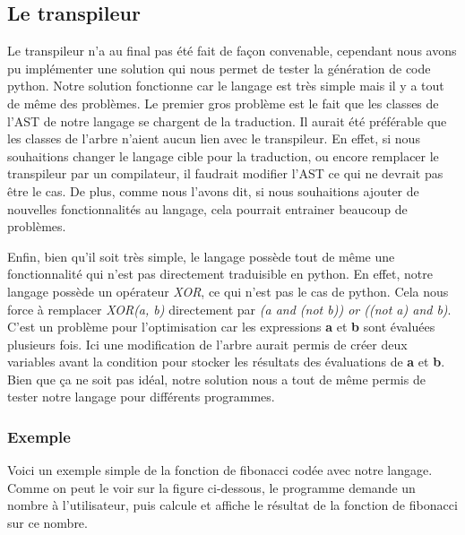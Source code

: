\documentclass[a4paper]{article}%
\begin{document}
\subsection{Le transpileur}

Le transpileur n'a au final pas été fait de façon convenable, cependant nous
avons pu implémenter une solution qui nous permet de tester la génération de
code python. Notre solution fonctionne car le langage est très simple mais il y
a tout de même des problèmes. Le premier gros problème est le fait que les
classes de l'AST de notre langage se chargent de la traduction. Il aurait été
préférable que les classes de l'arbre n'aient aucun lien avec le transpileur. En
effet, si nous souhaitions changer le langage cible pour la traduction, ou
encore remplacer le transpileur par un compilateur, il faudrait modifier l'AST
ce qui ne devrait pas être le cas. De plus, comme nous l'avons dit, si nous
souhaitions ajouter de nouvelles fonctionnalités au langage, cela pourrait
entrainer beaucoup de problèmes.

Enfin, bien qu'il soit très simple, le langage possède tout de même une
fonctionnalité qui n'est pas directement traduisible en python. En effet, notre
langage possède un opérateur \textit{XOR}, ce qui n'est pas le cas de python.
Cela nous force à remplacer \textit{XOR(a, b)} directement par \textit{(a and
(not b)) or ((not a) and b)}. C'est un problème pour l'optimisation car les
expressions \textbf{a} et \textbf{b} sont évaluées plusieurs fois. Ici une
modification de l'arbre aurait permis de créer deux variables avant la condition
pour stocker les résultats des évaluations de \textbf{a} et \textbf{b}.\\

Bien que ça ne soit pas idéal, notre solution nous a tout de même permis de
tester notre langage pour différents programmes.\\

\clearpage
\subsubsection*{Exemple}

Voici un exemple simple de la fonction de fibonacci codée avec notre langage.
Comme on peut le voir sur la figure ci-dessous, le programme demande un
nombre à l'utilisateur, puis calcule et affiche le résultat de la fonction de
fibonacci sur ce nombre.
\end{document}
